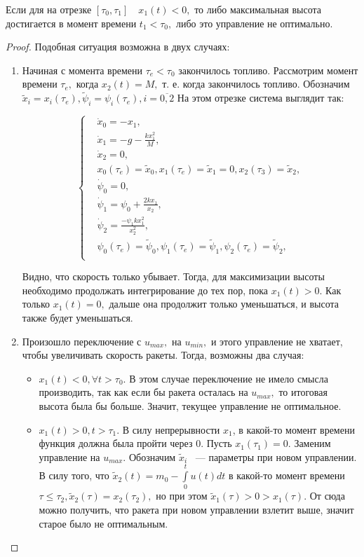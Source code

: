 \documentclass[10pt,pdf,hyperref={unicode}]{beamer}
\begin{document}
	\begin{propos}
		Если для на отрезке $[\tau_0, \tau_1] \quad x_1(t) < 0, $ 
		то либо максимальная высота достигается в момент времени $t_1 < \tau_0,$ либо это управление не оптимально.
	   \end{propos}
	   \begin{proof}
		Подобная ситуация возможна в двух случаях:
		\begin{enumerate}
		 \item Начиная с момента времени $\tau_e < \tau_0$ закончилось топливо. 
		  Рассмотрим момент времени $\tau_e,$ когда $x_2(t) = M,$ т. е. когда закончилось топливо.
		  Обозначим $\tilde x_i = x_i(\tau_e), \tilde \psi_i = \psi_i(\tau_e), i = \overline{0, 2}$
		  На этом отрезке система выглядит так:
	   
		\begin{equation}\label{endFuel}
		   \left\{
			\begin{aligned}
			 &\dot x_0 = -x_1,\\
			 &\dot x_1 = -g - \frac{k x_1^2}{M},\\
			 &\dot x_2 = 0,\\
			 &x_0(\tau_e) = \tilde x_0, x_1(\tau_e) = \tilde x_1 = 0, x_2(\tau_3) = \tilde x_2,\\
			 &\dot \psi_0 = 0, \\
			 &\dot \psi_1 = \psi_0 + \frac{2k x_1}{x_2}, \\
			 & \dot \psi_2 = \frac{-\psi_1kx_1^2}{x_2^2},\\
			 & \psi_0(\tau_e) = \tilde \psi_0, \psi_1(\tau_e) = \tilde \psi_1, \psi_2(\tau_e) = \tilde \psi_2 ,\\
		\end{aligned}
	   \right.
	   \end{equation}

	Видно, что скорость только убывает. Тогда, для максимизации высоты необходимо продолжать 
	интегрирование до тех пор, пока $x_1(t) > 0.$ Как только $x_1(t) = 0, $ дальше она продолжит только уменьшаться,
	и высота также будет уменьшаться.
	\item Произошло переключение с $u_{max}, $ на $u_{min},$ и этого управление не хватает, чтобы 
	увеличивать скорость ракеты. Тогда, возможны два случая:
	\begin{itemize}
		\item $x_1(t) < 0, \forall t > \tau_0.$ В этом случае переключение не имело смысла производить, так как если
		бы ракета осталась на $u_{max},$ то итоговая высота была бы больше. Значит, текущее управление не оптимальное.
		\item $x_1(t) > 0, t > \tau_1.$ В силу непрерывности $x_1$, в какой-то момент времени функция должна была пройти через 0.
		Пусть $x_1(\tau_1) = 0.$ Заменим управление на $u_{max}.$ Обозначим $\tilde x_i$ ~--- параметры при новом управлении.
		В силу того, что $\tilde x_2(t) = m_0 - \int \limits^t_0 u(t) dt$ в какой-то момент времени $\tau \le \tau_2, \tilde x_2(\tau) = x_2(\tau_2),$ 
		но при этом $\tilde x_1(\tau) > 0 > x_1(\tau).$ От сюда можно получить, что ракета при новом управлении взлетит выше, значит
		старое было не оптимальным.  
	\end{itemize} 
	\end{enumerate}
	\end{proof}
\end{document}
